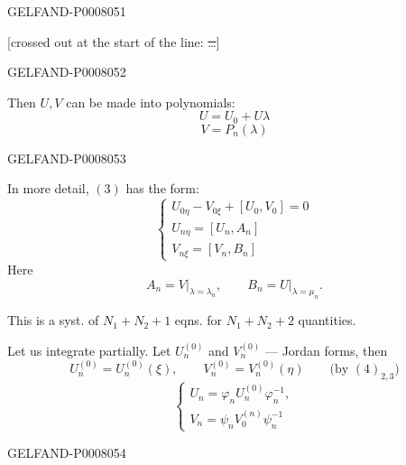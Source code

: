 \begin{GelfandAdjacentEvidence}{GELFAND-P000805}{1}

[crossed out at the start of the line: \sout{\ldots}]
\end{GelfandAdjacentEvidence}
\begin{GelfandAdjacentEvidence}{GELFAND-P000805}{2}


Then \(U,V\) can be made into polynomials:
\[
U=U_0+U\lambda
\]
\[
V=P_n(\lambda)
\]
\end{GelfandAdjacentEvidence}
\begin{GelfandAdjacentEvidence}{GELFAND-P000805}{3}


In more detail, \((3)\) has the form:
\begin{equation*}
\begin{cases}
U_{0\eta}-V_{0\xi}+[U_0,V_0]=0\\
U_{n\eta}=[U_n,A_n]\\
V_{n\xi}=[V_n,B_n]
\end{cases}
\tag{4}
\end{equation*}
Here
\begin{equation*}
A_n=V\big|_{\lambda=\lambda_n},\qquad
B_n=U\big|_{\lambda=\mu_n}.
\tag{5}
\end{equation*}

This is a syst. of \(N_1+N_2+1\) eqns. for \(N_1+N_2+2\) quantities.

Let us integrate partially. Let \(U_n^{(0)}\) and \(V_n^{(0)}\) --- Jordan forms,
then
\begin{equation*}
U_n^{(0)}=U_n^{(0)}(\xi),\qquad
V_n^{(0)}=V_n^{(0)}(\eta)
\qquad\text{(by \((4)_{2,3}\))}
\tag{6}
\end{equation*}
\begin{equation*}
\begin{cases}
U_n=\varphi_n U_n^{(0)}\varphi_n^{-1},\\
V_n=\psi_n V_0^{(n)}\psi_n^{-1}
\end{cases}
\tag{7}
\end{equation*}
\end{GelfandAdjacentEvidence}
\begin{GelfandAdjacentEvidence}{GELFAND-P000805}{4}

\end{GelfandAdjacentEvidence}
